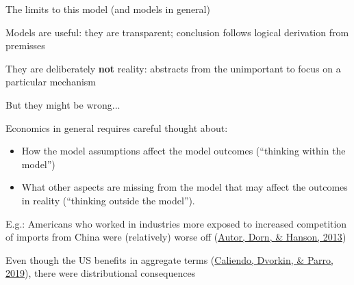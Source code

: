 \documentclass[notes,11pt, aspectratio=169, xcolor=table]{beamer}
\newenvironment{wideitemize}{\itemize\addtolength{\itemsep}{10pt}}{\enditemize}
\begin{document}
\begin{frame}{The limits to this model (and models in general)}
    \begin{wideitemize} 
        \item Models are useful: they are transparent; conclusion follows logical derivation from premisses
        \item<2-> They are deliberately \textbf{not} reality: abstracts from the unimportant
to focus on a particular mechanism
        \item<3-> But they might be wrong...
        \item<4-> Economics in general requires careful thought about:
        \begin{itemize}
            \item How the model assumptions affect the model outcomes
(``thinking within the model'')
            \item What other aspects are missing from the model that may affect the outcomes in reality (``thinking outside the model'').
\end{itemize}
        \item<5-> E.g.: Americans who worked in industries more exposed to increased competition of imports from China were (relatively) worse off (\href{https://www.aeaweb.org/articles?id=10.1257/aer.103.6.2121}{Autor, Dorn, \& Hanson, 2013})

        \item<6-> Even though the US benefits in aggregate terms (\href{https://onlinelibrary.wiley.com/doi/abs/10.3982/ECTA13758}{Caliendo, Dvorkin, \& Parro, 2019}), there were distributional consequences
    \end{wideitemize}
\end{frame}
\end{document}
